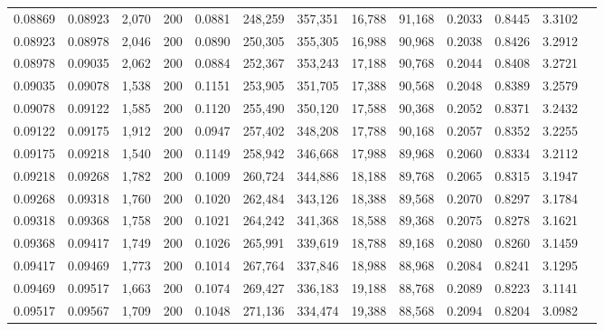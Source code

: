 \begin{tabular}{rrrrrrrrrrrrr}
0.08869 & 0.08923 & 2,070 & 200 &                                     0.0881 & 248,259 & 357,351 &  16,788 &  91,168 & 0.2033 & 0.8445 & 3.3102 \\
0.08923 & 0.08978 & 2,046 & 200 &                                     0.0890 & 250,305 & 355,305 &  16,988 &  90,968 & 0.2038 & 0.8426 & 3.2912 \\
0.08978 & 0.09035 & 2,062 & 200 &                                     0.0884 & 252,367 & 353,243 &  17,188 &  90,768 & 0.2044 & 0.8408 & 3.2721 \\
0.09035 & 0.09078 & 1,538 & 200 &                                     0.1151 & 253,905 & 351,705 &  17,388 &  90,568 & 0.2048 & 0.8389 & 3.2579 \\
0.09078 & 0.09122 & 1,585 & 200 &                                     0.1120 & 255,490 & 350,120 &  17,588 &  90,368 & 0.2052 & 0.8371 & 3.2432 \\
0.09122 & 0.09175 & 1,912 & 200 &                                     0.0947 & 257,402 & 348,208 &  17,788 &  90,168 & 0.2057 & 0.8352 & 3.2255 \\
0.09175 & 0.09218 & 1,540 & 200 &                                     0.1149 & 258,942 & 346,668 &  17,988 &  89,968 & 0.2060 & 0.8334 & 3.2112 \\
0.09218 & 0.09268 & 1,782 & 200 &                                     0.1009 & 260,724 & 344,886 &  18,188 &  89,768 & 0.2065 & 0.8315 & 3.1947 \\
0.09268 & 0.09318 & 1,760 & 200 &                                     0.1020 & 262,484 & 343,126 &  18,388 &  89,568 & 0.2070 & 0.8297 & 3.1784 \\
0.09318 & 0.09368 & 1,758 & 200 &                                     0.1021 & 264,242 & 341,368 &  18,588 &  89,368 & 0.2075 & 0.8278 & 3.1621 \\
0.09368 & 0.09417 & 1,749 & 200 &                                     0.1026 & 265,991 & 339,619 &  18,788 &  89,168 & 0.2080 & 0.8260 & 3.1459 \\
0.09417 & 0.09469 & 1,773 & 200 &                                     0.1014 & 267,764 & 337,846 &  18,988 &  88,968 & 0.2084 & 0.8241 & 3.1295 \\
0.09469 & 0.09517 & 1,663 & 200 &                                     0.1074 & 269,427 & 336,183 &  19,188 &  88,768 & 0.2089 & 0.8223 & 3.1141 \\
0.09517 & 0.09567 & 1,709 & 200 &                                     0.1048 & 271,136 & 334,474 &  19,388 &  88,568 & 0.2094 & 0.8204 & 3.0982 \\

\end{tabular}
